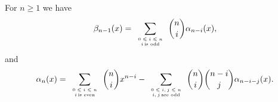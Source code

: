 \documentclass[11pt]{amsart}
\begin{document}
\begin{lem}\label{alpha(x)}
For $n\geq 1$ we have \[
\beta_{n-1}(x)=\sum_{\tiny
\begin{array}{cc}
0\leqslant i\leqslant n\\
i \, \text{is odd}
\end{array}}{n \choose i}\alpha_{n-i}(x),\]
and 
\begin{align*}
\alpha_{n}(x)=\sum_{\tiny
\begin{array}{cc}
0\leqslant i\leqslant n\\
i \, \text{is even}
\end{array}} {n \choose i}x^{n-i}-\sum_{\tiny
\begin{array}{cc}
0\leqslant i,j\leqslant n\\
i,j \, \text{are odd}
\end{array}} {n \choose i} {n-i \choose j}\alpha_{n-i-j}(x).
\end{align*}
\end{lem}
\end{document}
